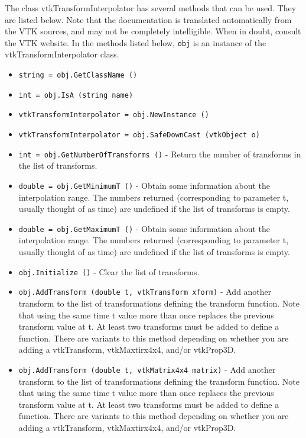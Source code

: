 The class vtkTransformInterpolator has several methods that can be used.
  They are listed below.
Note that the documentation is translated automatically from the VTK sources,
and may not be completely intelligible.  When in doubt, consult the VTK website.
In the methods listed below, \verb|obj| is an instance of the vtkTransformInterpolator class.
\begin{itemize}
\item  \verb|string = obj.GetClassName ()|

\item  \verb|int = obj.IsA (string name)|

\item  \verb|vtkTransformInterpolator = obj.NewInstance ()|

\item  \verb|vtkTransformInterpolator = obj.SafeDownCast (vtkObject o)|

\item  \verb|int = obj.GetNumberOfTransforms ()| -  Return the number of transforms in the list of transforms.

\item  \verb|double = obj.GetMinimumT ()| -  Obtain some information about the interpolation range. The numbers
 returned (corresponding to parameter t, usually thought of as time)
 are undefined if the list of transforms is empty.

\item  \verb|double = obj.GetMaximumT ()| -  Obtain some information about the interpolation range. The numbers
 returned (corresponding to parameter t, usually thought of as time)
 are undefined if the list of transforms is empty.

\item  \verb|obj.Initialize ()| -  Clear the list of transforms.

\item  \verb|obj.AddTransform (double t, vtkTransform xform)| -  Add another transform to the list of transformations defining
 the transform function. Note that using the same time t value
 more than once replaces the previous transform value at t.
 At least two transforms must be added to define a function.
 There are variants to this method depending on whether you are
 adding a vtkTransform, vtkMaxtirx4x4, and/or vtkProp3D.

\item  \verb|obj.AddTransform (double t, vtkMatrix4x4 matrix)| -  Add another transform to the list of transformations defining
 the transform function. Note that using the same time t value
 more than once replaces the previous transform value at t.
 At least two transforms must be added to define a function.
 There are variants to this method depending on whether you are
 adding a vtkTransform, vtkMaxtirx4x4, and/or vtkProp3D.


\end{itemize}
